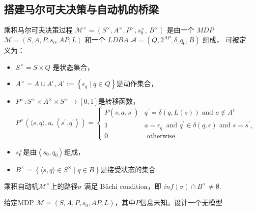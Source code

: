 \subsection{搭建马尔可夫决策与自动机的桥梁}
\begin{definition}
乘积马尔可夫决策过程 $\mathcal{M}^{\times}=\left(S^{\times}, A^{\times}, P^{\times}, s_0^{\times}\right.$, $\left.B^{\times}\right)$
是由一个 $M D P$ $\mathcal{M}=\left(S, A, P, s_0, A P, L\right)$ 和一个 $L D B A$ $\mathcal{A}=\left(Q, 2^{A P}, \delta, q_0, B\right)$ 组成，
可被定义为：
\begin{itemize}
    \item $S^{\times}=S \times Q$ 是状态集合，
    \item $A^{\times}=A \cup A^\epsilon, A^\epsilon:=\left\{\epsilon_q \mid q \in Q\right\}$是动作集合，
    \item $P^{\times}: S^{\times} \times A^{\times} \times S^{\times} \rightarrow[0,1]$是转移函数，
    $$
    P^{\times}\left(\langle s, q\rangle, a,\left\langle s^{\prime}, q^{\prime}\right\rangle\right)
    = 
    \begin{cases}
    P\left(s, a, s^{\prime}\right) & q^{\prime}=\delta(q, L(s)) \text { and } a \notin A^\epsilon 
    \\ 1 & a=\epsilon_{q^{\prime}} \text { and } q^{\prime} \in \delta(q, \epsilon) \text { and } s=s^{\prime}, 
    \\ 0 & \text { otherwise }
    \end{cases}
    $$
    \item $s_0^{\times}$是由$\left\langle s_0, q_0\right\rangle$组成，
    \item $B^{\times}=\left\{\langle s, q\rangle \in S^{\times} \mid q \in B\right\}$是接受状态的集合
\end{itemize}
乘积自动机$\mathcal{M}^{\times}$上的路径$\sigma$ 满足 Büchi condition，即 $inf(\sigma) \cap B^{\times} \neq \emptyset$.
\end{definition}

\begin{problem}
给定MDP $\mathcal{M} =(S,A,P,s_0,AP,L)$，其中$P$信息未知。设计一个无模型
\end{problem}